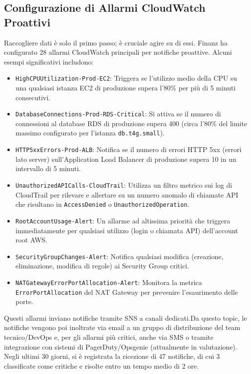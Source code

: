 \subsection{Configurazione di Allarmi CloudWatch Proattivi}
\label{subsec:cloudwatch-alarms_cap2}
Raccogliere dati è solo il primo passo; è cruciale agire su di essi. Finanz ha configurato 28 allarmi CloudWatch principali per notifiche proattive. Alcuni esempi significativi includono:
\begin{itemize}
    \item \texttt{HighCPUUtilization-Prod-EC2}: Triggera se l'utilizzo medio della CPU su una qualsiasi istanza EC2 di produzione supera l'80\% per più di 5 minuti consecutivi.
    \item \texttt{DatabaseConnections-Prod-RDS-Critical}: Si attiva se il numero di connessioni al database RDS di produzione supera 400 (circa l'80\% del limite massimo configurato per l'istanza \texttt{db.t4g.small}).
    \item \texttt{HTTP5xxErrors-Prod-ALB}: Notifica se il numero di errori HTTP 5xx (errori lato server) sull'Application Load Balancer di produzione supera 10 in un intervallo di 5 minuti.
    \item \texttt{UnauthorizedAPICalls-CloudTrail}: Utilizza un filtro metrico sui log di CloudTrail per rilevare e allertare su un numero anomalo di chiamate API che risultano in \texttt{AccessDenied} o \texttt{UnauthorizedOperation}.
    \item \texttt{RootAccountUsage-Alert}: Un allarme ad altissima priorità che triggera immediatamente per qualsiasi utilizzo (login o chiamata API) dell'account root AWS.
    \item \texttt{SecurityGroupChanges-Alert}: Notifica qualsiasi modifica (creazione, eliminazione, modifica di regole) ai Security Group critici.
    \item \texttt{NATGatewayErrorPortAllocation-Alert}: Monitora la metrica \texttt{ErrorPortAllocation} del NAT Gateway per prevenire l'esaurimento delle porte.
\end{itemize}
Questi allarmi inviano notifiche tramite SNS a canali dedicati.Da questo topic, le notifiche vengono poi inoltrate via email a un gruppo di distribuzione del team tecnico/DevOps e, per gli allarmi più critici, anche via SMS o tramite integrazione con sistemi di PagerDuty/Opsgenie (attualmente in valutazione). Negli ultimi 30 giorni, si è registrata la ricezione di 47 notifiche, di cui 3 classificate come critiche e risolte entro un tempo medio di 2 ore.

